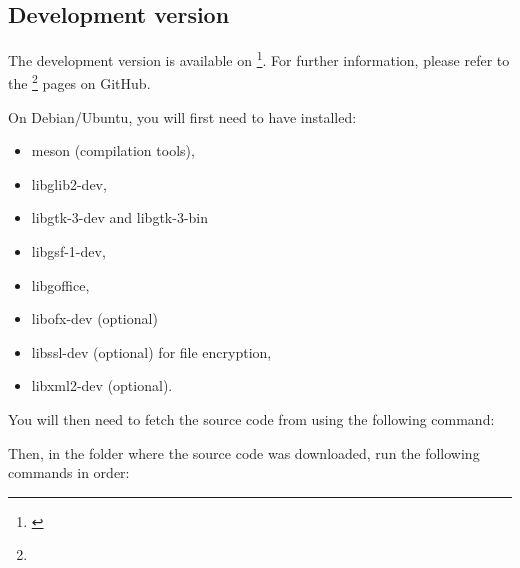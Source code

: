 \subsection{Development version\label{start-install-devel}}

The development version is available on \footnote{\label{fn:github}\urlGitHubGrisbi}. %
For further information, please refer to the \footnote{\urlGitHubGrisbiWiki} pages on GitHub.

\noindent
On Debian/Ubuntu, you will first need to have installed:
\begin{itemize}
	\item meson (compilation tools),
	\item libglib2-dev,
	\item libgtk-3-dev and libgtk-3-bin
	\item libgsf-1-dev,
	\item libgoffice,
	\item libofx-dev (optional)%
	\item libssl-dev (optional) for file encryption,%
	\item libxml2-dev (optional).
\end{itemize}

You will then need to fetch the source code from  using the following command:


Then, in the folder where the source code was downloaded, run the following commands in order:

